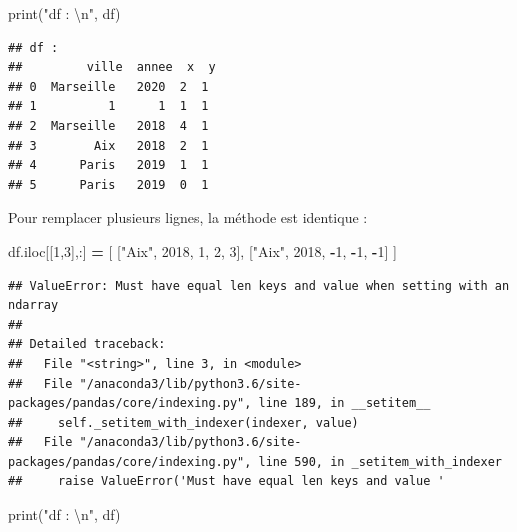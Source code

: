 \documentclass[12pt,]{book}
\newenvironment{Shaded}{\begin{snugshade}}{\end{snugshade}}
\newcommand{\DecValTok}[1]{\textcolor[rgb]{0.00,0.00,0.81}{#1}}
\newcommand{\CharTok}[1]{\textcolor[rgb]{0.31,0.60,0.02}{#1}}
\newcommand{\StringTok}[1]{\textcolor[rgb]{0.31,0.60,0.02}{#1}}
\newcommand{\OperatorTok}[1]{\textcolor[rgb]{0.81,0.36,0.00}{\textbf{#1}}}
\newcommand{\BuiltInTok}[1]{#1}
\newcommand{\NormalTok}[1]{#1}
\numberwithin{equation}{section}
\numberwithin{countremarque}{section}
\begin{document}
\begin{Shaded}
\begin{Highlighting}[]
\BuiltInTok{print}\NormalTok{(}\StringTok{"df : }\CharTok{\textbackslash{}n}\StringTok{"}\NormalTok{, df)}
\end{Highlighting}
\end{Shaded}

\begin{lstlisting}
## df : 
##         ville  annee  x  y
## 0  Marseille   2020  2  1
## 1          1      1  1  1
## 2  Marseille   2018  4  1
## 3        Aix   2018  2  1
## 4      Paris   2019  1  1
## 5      Paris   2019  0  1
\end{lstlisting}

Pour remplacer plusieurs lignes, la méthode est identique :

\begin{Shaded}
\begin{Highlighting}[]
\NormalTok{df.iloc[[}\DecValTok{1}\NormalTok{,}\DecValTok{3}\NormalTok{],:] }\OperatorTok{=}\NormalTok{ [}
\NormalTok{    [}\StringTok{"Aix"}\NormalTok{, }\DecValTok{2018}\NormalTok{, }\DecValTok{1}\NormalTok{, }\DecValTok{2}\NormalTok{, }\DecValTok{3}\NormalTok{],}
\NormalTok{    [}\StringTok{"Aix"}\NormalTok{, }\DecValTok{2018}\NormalTok{, }\OperatorTok{-}\DecValTok{1}\NormalTok{, }\OperatorTok{-}\DecValTok{1}\NormalTok{, }\OperatorTok{-}\DecValTok{1}\NormalTok{]}
\NormalTok{]}
\end{Highlighting}
\end{Shaded}

\begin{lstlisting}
## ValueError: Must have equal len keys and value when setting with an ndarray
## 
## Detailed traceback: 
##   File "<string>", line 3, in <module>
##   File "/anaconda3/lib/python3.6/site-packages/pandas/core/indexing.py", line 189, in __setitem__
##     self._setitem_with_indexer(indexer, value)
##   File "/anaconda3/lib/python3.6/site-packages/pandas/core/indexing.py", line 590, in _setitem_with_indexer
##     raise ValueError('Must have equal len keys and value '
\end{lstlisting}

\begin{Shaded}
\begin{Highlighting}[]
\BuiltInTok{print}\NormalTok{(}\StringTok{"df : }\CharTok{\textbackslash{}n}\StringTok{"}\NormalTok{, df)}
\end{Highlighting}
\end{Shaded}
\end{document}
